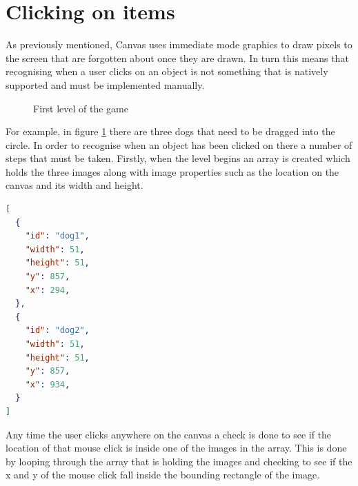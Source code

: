 \documentclass[12pt,a4paper]{report}
\begin{document}
\section{Clicking on items}
As previously mentioned, Canvas uses immediate mode graphics to draw pixels to the screen that are forgotten about once they are drawn. In turn this means that recognising when a user clicks on an object is not something that is natively supported and must be implemented manually. 

\begin{figure}[h]
  \centering
  \begin{minipage}[b]{1\textwidth}
    \caption{First level of the game}
    \label{fig:selectDogs}
  \end{minipage}
\end{figure}
\FloatBarrier

For example, in figure \ref{fig:selectDogs} there are three dogs that need to be dragged into the circle. In order to recognise when an object has been clicked on there a number of steps that must be taken. Firstly, when the level begins an array is created which holds the three images along with image properties such as the location on the canvas and its width and height.

\begin{minipage}{\linewidth}
\begin{lstlisting}[language=json]
[
  {
    "id": "dog1",
    "width": 51,
    "height": 51,
    "y": 857,
    "x": 294,
  },
  {
    "id": "dog2",
    "width": 51,
    "height": 51,
    "y": 857,
    "x": 934,
  }
]
\end{lstlisting}
\end{minipage}

Any time the user clicks anywhere on the canvas a check is done to see if the location of that mouse click is inside one of the images in the array.
This is done by looping through the array that is holding the images and checking to see if the x and y of the mouse click fall inside the bounding rectangle of the image.
\end{document}

